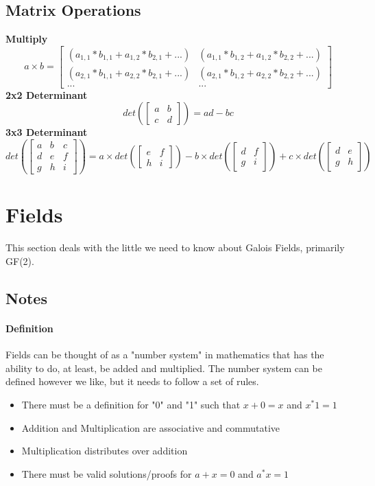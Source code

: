 \subsection{Matrix Operations}
\textbf{Multiply}
\begin{equation}
a \times b = \begin{bmatrix}
(a_{1,1} * b_{1,1} + a_{1,2}*b_{2,1} + ...) & (a_{1,1} * b_{1,2} + a_{1,2}*b_{2,2} + ...) \\
(a_{2,1} * b_{1,1} + a_{2,2}*b_{2,1} + ...) & (a_{2,1} * b_{1,2} + a_{2,2}*b_{2,2} + ...) \\
... & ...
\end{bmatrix}
\end{equation}
\textbf{2x2 Determinant}
\begin{equation}
	det (\begin{bmatrix}
	a & b \\ c & d
	\end{bmatrix})  = ad - bc
\end{equation}
\textbf{3x3 Determinant}
\begin{equation}
	det (\begin{bmatrix}
		a & b & c\\ d & e & f \\ g & h & i
	\end{bmatrix})  = a \times det(\begin{bmatrix}
	e & f \\ h & i
	\end{bmatrix}) - b \times det(\begin{bmatrix}
	d & f \\ g & i
	\end{bmatrix}) + c \times det(\begin{bmatrix}
	d & e \\ g & h
	\end{bmatrix})
\end{equation}

\section{Fields}
This section deals with the little we need to know about Galois Fields, primarily GF(2).
\subsection{Notes}
\paragraph{Definition} Fields can be thought of as a "number system" in mathematics that has the ability to do, at least, be added and multiplied. The number system can be defined however we like, but it needs to follow a set of rules.
\begin{itemize}
	\item There must be a definition for "0" and "1" such that $x+0 = x$ and $x^*1 = 1$
	\item Addition and Multiplication are associative and commutative
	\item Multiplication distributes over addition
	\item There must be valid solutions/proofs for $a + x = 0$ and $a^*x = 1$
\end{itemize}
